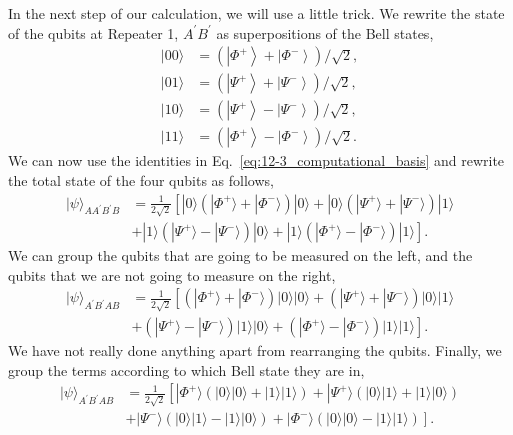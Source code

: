 In the next step of our calculation, we will use a little trick.
We rewrite the state of the qubits at Repeater 1, $A^{\prime}B^{\prime}$ as superpositions of the Bell states,
\begin{align}
|00\rangle & = \left(\left|\Phi^{+}\right\rangle+\left|\Phi^{-}\right\rangle\right) / \sqrt{2}, \\
|01\rangle & = \left(\left|\Psi^{+}\right\rangle+\left|\Psi^{-}\right\rangle\right) / \sqrt{2}, \\
|10\rangle & = \left(\left|\Psi^{+}\right\rangle-\left|\Psi^{-}\right\rangle\right) / \sqrt{2}, \\
|11\rangle & = \left(\left|\Phi^{+}\right\rangle-\left|\Phi^{-}\right\rangle\right) / \sqrt{2}.
\end{align}
We can now use the identities in Eq.~\ref{eq:12-3_computational_basis} and rewrite the total state of the four qubits as follows,
\begin{align}
    |\psi\rangle_{AA^{\prime}B^{\prime}B} & = \frac{1}{2\sqrt{2}} \left[ |0\rangle (|\Phi^+\rangle + |\Phi^-\rangle) |0\rangle + |0\rangle (|\Psi^+\rangle + |\Psi^-\rangle) |1\rangle \right. \nonumber\\
    & + \left. |1\rangle (|\Psi^+\rangle - |\Psi^-\rangle) |0\rangle + |1\rangle (|\Phi^+\rangle - |\Phi^-\rangle) |1\rangle \right].
\end{align}
We can group the qubits that are going to be measured on the left, and the qubits that we are not going to measure on the right,
\begin{align}
    |\psi\rangle_{A^{\prime}B^{\prime}AB} & = \frac{1}{2\sqrt{2}} \left[ (|\Phi^+\rangle + |\Phi^-\rangle)|0\rangle|0\rangle + (|\Psi^+\rangle + |\Psi^-\rangle)|0\rangle|1\rangle \right. \nonumber\\
    & + \left. (|\Psi^+\rangle - |\Psi^-\rangle)|1\rangle|0\rangle + (|\Phi^+\rangle - |\Phi^-\rangle)|1\rangle|1\rangle \right].
\end{align}
We have not really done anything apart from rearranging the qubits.
Finally, we group the terms according to which Bell state they are in,
\begin{align}
    |\psi\rangle_{A^{\prime}B^{\prime}AB} & = \frac{1}{2\sqrt{2}} \left[ |\Phi^+\rangle (|0\rangle|0\rangle + |1\rangle|1\rangle) + |\Psi^+\rangle (|0\rangle|1\rangle + |1\rangle|0\rangle) \right. \nonumber\\
    & + \left. |\Psi^-\rangle (|0\rangle|1\rangle - |1\rangle|0\rangle) + |\Phi^-\rangle (|0\rangle|0\rangle - |1\rangle|1\rangle) \right].
    \label{eq:12-3_almost_final}
\end{align}

